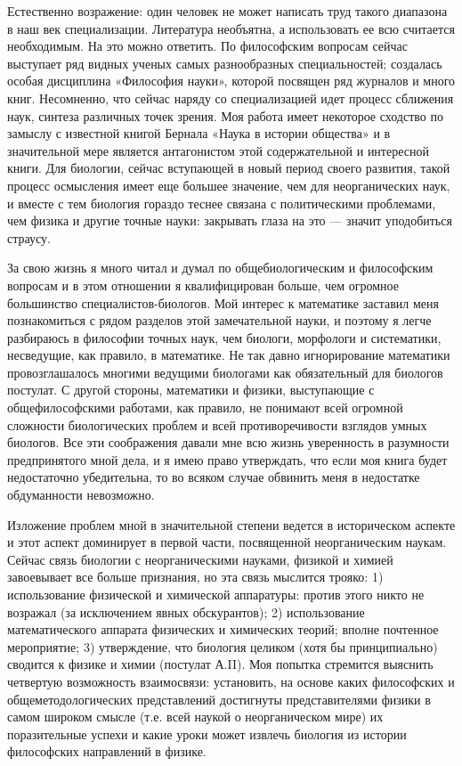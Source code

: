 Естественно возражение: один человек не может написать труд такого
диапазона в наш век специализации. Литература необъятна, а
использовать ее всю считается необходимым. На это можно ответить. По
философским вопросам сейчас выступает ряд видных ученых самых
разнообразных специальностей; создалась особая дисциплина «Философия
науки», которой посвящен ряд журналов и много книг. Несомненно, что
сейчас наряду со специализацией идет процесс сближения наук, синтеза
различных точек зрения. Моя работа имеет некоторое сходство по замыслу
с известной книгой Бернала «Наука в истории общества» и в значительной
мере является антагонистом этой содержательной и интересной книги. Для
биологии, сейчас вступающей в новый период своего развития, такой
процесс осмысления имеет еще большее значение, чем для неорганических
наук, и вместе с тем биология гораздо теснее связана с политическими
проблемами, чем физика и другие точные науки: закрывать глаза на это
--- значит уподобиться страусу.

За свою жизнь я много читал и думал по общебиологическим и философским
вопросам и в этом отношении я квалифицирован больше, чем огромное
большинство специалистов-биологов. Мой интерес к математике заставил
меня познакомиться с рядом разделов этой замечательной науки, и
поэтому я легче разбираюсь в философии точных наук, чем биологи,
морфологи и систематики, несведущие, как правило, в математике. Не так
давно игнорирование математики провозглашалось многими ведущими
биологами как обязательный для биологов постулат. С другой стороны,
математики и физики, выступающие с общефилософскими работами, как
правило, не понимают всей огромной сложности биологических проблем и
всей противоречивости взглядов умных биологов. Все эти соображения
давали мне всю жизнь уверенность в разумности предпринятого мной дела,
и я имею право утверждать, что если моя книга будет недостаточно
убедительна, то во всяком случае обвинить меня в недостатке
обдуманности невозможно.

Изложение проблем мной в значительной степени ведется в историческом
аспекте и этот аспект доминирует в первой части, посвященной
неорганическим наукам. Сейчас связь биологии с неорганическими
науками, физикой и химией завоевывает все больше признания, но эта
связь мыслится трояко: 1) использование физической и химической
аппаратуры: против этого никто не возражал (за исключением явных
обскурантов); 2) использование математического аппарата физических и
химических теорий; вполне почтенное мероприятие; 3) утверждение, что
биология целиком (хотя бы принципиально) сводится к физике и химии
(постулат А.II). Моя попытка стремится выяснить четвертую возможность
взаимосвязи: установить, на основе каких философских и
общеметодологических представлений достигнуты представителями физики в
самом широком смысле (т.е. всей наукой о неорганическом мире) их
поразительные успехи и какие уроки может извлечь биология из истории
философских направлений в физике.

